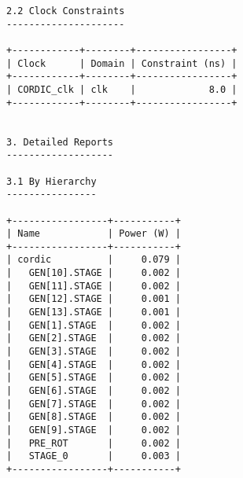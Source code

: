 \begin{Verbatim}[fontsize=\footnotesize,xleftmargin=-2cm]
2.2 Clock Constraints
---------------------

+------------+--------+-----------------+
| Clock      | Domain | Constraint (ns) |
+------------+--------+-----------------+
| CORDIC_clk | clk    |             8.0 |
+------------+--------+-----------------+


3. Detailed Reports
-------------------

3.1 By Hierarchy
----------------

+-----------------+-----------+
| Name            | Power (W) |
+-----------------+-----------+
| cordic          |     0.079 |
|   GEN[10].STAGE |     0.002 |
|   GEN[11].STAGE |     0.002 |
|   GEN[12].STAGE |     0.001 |
|   GEN[13].STAGE |     0.001 |
|   GEN[1].STAGE  |     0.002 |
|   GEN[2].STAGE  |     0.002 |
|   GEN[3].STAGE  |     0.002 |
|   GEN[4].STAGE  |     0.002 |
|   GEN[5].STAGE  |     0.002 |
|   GEN[6].STAGE  |     0.002 |
|   GEN[7].STAGE  |     0.002 |
|   GEN[8].STAGE  |     0.002 |
|   GEN[9].STAGE  |     0.002 |
|   PRE_ROT       |     0.002 |
|   STAGE_0       |     0.003 |
+-----------------+-----------+
\end{Verbatim}
